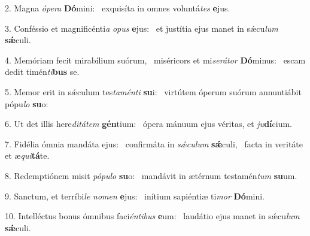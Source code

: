 2. Magna \textit{ó}\textit{pe}\textit{ra} \textbf{Dó}mini: \ast\  exquisíta in omnes voluntá\textit{tes} \textbf{e}jus.\

3. Conféssio et magnificénti\textit{a} \textit{o}\textit{pus} \textbf{e}jus: \ast\  et justítia ejus manet in sǽcu\textit{lum} \textbf{sǽ}culi.\

4. Memóriam fecit mirabílium suórum, \dag\  miséricors et mi\textit{se}\textit{rá}\textit{tor} \textbf{Dó}minus: \ast\  escam dedit timén\textit{ti}\textbf{bus} se.\

5. Memor erit in sǽculum tes\textit{ta}\textit{mén}\textit{ti} \textbf{su}i: \ast\  virtútem óperum suórum annuntiábit pópu\textit{lo} \textbf{su}o:\

6. Ut det illis here\textit{di}\textit{tá}\textit{tem} \textbf{gén}tium: \ast\  ópera mánuum ejus véritas, et \textit{ju}\textbf{dí}cium.\

7. Fidélia ómnia mandáta ejus: \dag\  confirmáta in \textit{sǽ}\textit{cu}\textit{lum} \textbf{sǽ}culi, \ast\  facta in veritáte et æ\textit{qui}\textbf{tá}te.\

8. Redemptiónem misit \textit{pó}\textit{pu}\textit{lo} \textbf{su}o: \ast\  mandávit in ætérnum testamén\textit{tum} \textbf{su}um.\

9. Sanctum, et terríbi\textit{le} \textit{no}\textit{men} \textbf{e}jus: \ast\  inítium sapiéntiæ ti\textit{mor} \textbf{Dó}mini.\

10. Intelléctus bonus ómnibus faci\textit{én}\textit{ti}\textit{bus} \textbf{e}um: \ast\  laudátio ejus manet in sǽcu\textit{lum} \textbf{sǽ}culi.\

